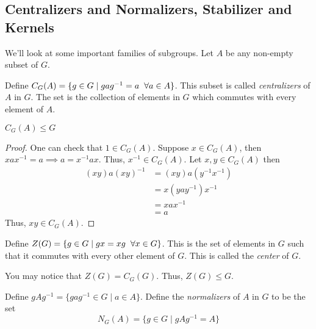 \subsection{Centralizers and Normalizers, Stabilizer and Kernels}

We'll look at some important families of subgroups. Let $A$ be any non-empty subset of $G$.
\begin{definition}
    Define $C_G(A)=\{g \in G \mid g a g^{-1} = a \hspace{2mm}\forall a \in A\}$. This subset is called \textit{centralizers} of $A$ in $G$.
    The set is the collection of elements in $G$ which commutes with every element of $A$.
\end{definition}


\begin{proposition}
    $C_G(A) \le G$
\end{proposition}

\begin{proof}
    One can check that $1 \in C_G(A)$. Suppose $x \in C_G(A)$, then $xax^{-1}=a \implies a = x^{-1}ax$. Thus, $x^{-1} \in C_G(A)$.
    Let $x,y \in C_G(A)$ then 
    \begin{align*}
        (xy) a (xy)^{-1} &= (xy) a (y^{-1}x^{-1}) \\
        &= x(yay^{-1})x^{-1} \\
        &= xax^{-1} \\
        &=a
    \end{align*}
    Thus, $xy \in C_G(A)$.
\end{proof}

\begin{definition}
    Define $Z(G)=\{g \in G \mid gx=xg \hspace{2mm} \forall x \in G\}$. This is the set of elements in $G$ such that it commutes with every 
    other element of $G$. This is called the \textit{center} of $G$. 
\end{definition}

\begin{remark}
    You may notice that $Z(G)=C_G(G)$. Thus, $Z(G) \le G$.
\end{remark}

\begin{definition}
    Define $gAg^{-1}=\{gag^{-1} \in G \mid a \in A\}$. Define the \textit{normalizers}
    of $A$ in $G$ to be the set 
    \[ N_G(A) = \{g \in G \mid g A g^{-1} = A\} \]
\end{definition}


